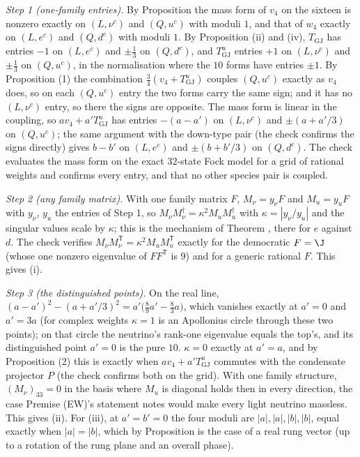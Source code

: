 \emph{Step 1 (one-family entries).} By Proposition  the mass form of $v_{4}$ on the sixteen is nonzero exactly on $(L, \nu^{c})$ and $(Q, u^{c})$ with moduli $1$, and that of $w_{4}$ exactly on $(L, e^{c})$ and $(Q, d^{c})$ with moduli $1$. By Proposition (ii) and (iv), $T_{\mathrm{GJ}}$ has entries $-1$ on $(L, e^{c})$ and $\pm\tfrac13$ on $(Q, d^{c})$, and $T^{u}_{\mathrm{GJ}}$ entries $+1$ on $(L, \nu^{c})$ and $\pm\tfrac13$ on $(Q, u^{c})$, in the normalisation where the $10$ forms have entries $\pm 1$. By Proposition (1) the combination $\tfrac34(v_{4} + T^{u}_{\mathrm{GJ}})$ couples $(Q, u^{c})$ exactly as $v_{4}$ does, so on each $(Q, u^{c})$ entry the two forms carry the same sign; and it has no $(L, \nu^{c})$ entry, so there the signs are opposite. The mass form is linear in the coupling, so $a v_{4} + a' T^{u}_{\mathrm{GJ}}$ has entries $-(a - a')$ on $(L, \nu^{c})$ and $\pm(a + a'/3)$ on $(Q, u^{c})$; the same argument with the down-type pair (the check confirms the signs directly) gives $b - b'$ on $(L, e^{c})$ and $\pm(b + b'/3)$ on $(Q, d^{c})$. The check evaluates the mass form on the exact $32$-state Fock model for a grid of rational weights and confirms every entry, and that no other species pair is coupled.

\emph{Step 2 (any family matrix).} With one family matrix $F$, $M_{\nu} = y_{\nu}F$ and $M_{u} = y_{u}F$ with $y_{\nu}$, $y_{u}$ the entries of Step 1, so $M_{\nu}M_{\nu}^{\dagger} = \kappa^{2}M_{u}M_{u}^{\dagger}$ with $\kappa = |y_{\nu}/y_{u}|$ and the singular values scale by $\kappa$; this is the mechanism of Theorem , there for $e$ against $d$. The check verifies $M_{\nu}M_{\nu}^{\mathsf{T}} = \kappa^{2}M_{u}M_{u}^{\mathsf{T}}$ exactly for the democratic $F = \J$ (whose one nonzero eigenvalue of $FF^{\mathsf{T}}$ is $9$) and for a generic rational $F$. This gives (i).

\emph{Step 3 (the distinguished points).} On the real line, $(a - a')^{2} - (a + a'/3)^{2} = a'\bigl(\tfrac89 a' - \tfrac83 a\bigr)$, which vanishes exactly at $a' = 0$ and $a' = 3a$ (for complex weights $\kappa = 1$ is an Apollonius circle through these two points); on that circle the neutrino's rank-one eigenvalue equals the top's, and its distinguished point $a' = 0$ is the pure $10$. $\kappa = 0$ exactly at $a' = a$, and by Proposition (2) this is exactly when $a v_{4} + a' T^{u}_{\mathrm{GJ}}$ commutes with the condensate projector $P$ (the check confirms both on the grid). With one family structure, $(M_{\nu})_{33} = 0$ in the basis where $M_{u}$ is diagonal holds then in every direction, the case Premise (EW)'s statement notes would make every light neutrino massless. This gives (ii). For (iii), at $a' = b' = 0$ the four moduli are $|a|, |a|, |b|, |b|$, equal exactly when $|a| = |b|$, which by Proposition  is the case of a real rung vector (up to a rotation of the rung plane and an overall phase).

